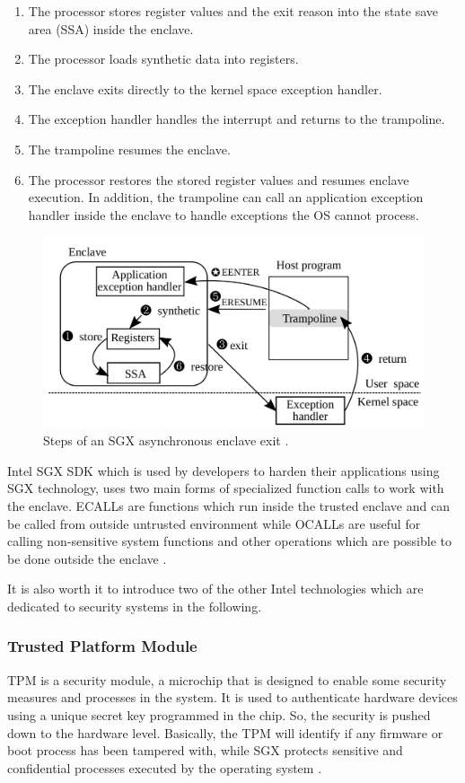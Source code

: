 \begin{enumerate}
	\item The processor stores register values and the exit reason into the state save area (SSA) inside the enclave.
	\item The processor loads synthetic data into registers.
	\item The enclave exits directly to the kernel space exception handler.
	\item The exception handler handles the interrupt and returns to the trampoline.
	\item The trampoline resumes the enclave.
	\item The processor restores the stored register values and resumes enclave execution. In addition, the trampoline can call an application exception handler inside the enclave to handle exceptions the OS cannot process.
\end{enumerate}

\begin{figure}
	\includegraphics[scale=0.2]{images/tsgx}
	\caption{Steps of an SGX asynchronous enclave exit \cite{tsgx}.}
	\label{fig:aex}
\end{figure}

Intel SGX SDK \cite{sgxapi} which is used by developers to harden their applications using SGX technology, uses two main forms of specialized function calls to work with the enclave. ECALLs are functions which run inside the trusted enclave and can be called from outside untrusted environment while OCALLs are useful for calling non-sensitive system functions and other operations which are possible to be done outside the enclave \cite{ecallocall}.

It is also worth it to introduce two of the other Intel technologies which are dedicated to security systems in the following.

\subsubsection{Trusted Platform Module}
TPM is a security module, a microchip that is designed to enable some security measures and processes in the system. It is used to authenticate hardware devices using a unique secret key programmed in the chip. So, the security is pushed down to the hardware level. Basically, the TPM will identify if any firmware or boot process has been tampered with, while SGX protects sensitive and confidential processes executed by the operating system \cite{wptpm,sptpm}.


